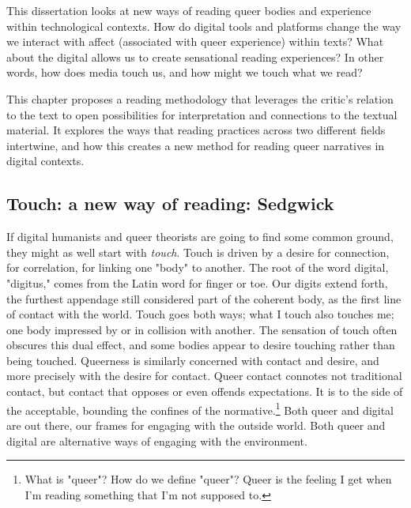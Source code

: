 \documentclass[11pt]{article}
\author{Filipa  Calado}
\date{\today}
\title{}
\begin{document}
\tableofcontents

This dissertation looks at new ways of reading queer bodies and
experience within technological contexts. How do digital tools and
platforms change the way we interact with affect (associated with
queer experience) within texts? What about the digital allows us to
create sensational reading experiences? In other words, how does media
touch us, and how might we touch what we read?

This chapter proposes a reading methodology that leverages the
critic's relation to the text to open possibilities for interpretation
and connections to the textual material. It explores the ways that
reading practices across two different fields intertwine, and how this
creates a new method for reading queer narratives in digital
contexts. 

\subsection{Touch: a new way of reading: Sedgwick}
\label{sec:orge277c56}

If digital humanists and queer theorists are going to find some common
ground, they might as well start with \emph{touch}. Touch is driven by a
desire for connection, for correlation, for linking one "body" to
another. The root of the word digital, "digitus," comes from the Latin
word for finger or toe. Our digits extend forth, the furthest
appendage still considered part of the coherent body, as the first
line of contact with the world. Touch goes both ways; what I touch
also touches me; one body impressed by or in collision with
another. The sensation of touch often obscures this dual effect, and
some bodies appear to desire touching rather than being
touched. Queerness is similarly concerned with contact and desire, and
more precisely with the desire for contact. Queer contact connotes not
traditional contact, but contact that opposes or even offends
expectations. It is to the side of the acceptable, bounding the
confines of the normative.\footnote{What is "queer"? How do we define "queer"? Queer is the feeling
I get when I'm reading something that I'm not supposed to.} Both queer and digital are out there,
our frames for engaging with the outside world. Both queer and digital
are alternative ways of engaging with the environment.
\end{document}
